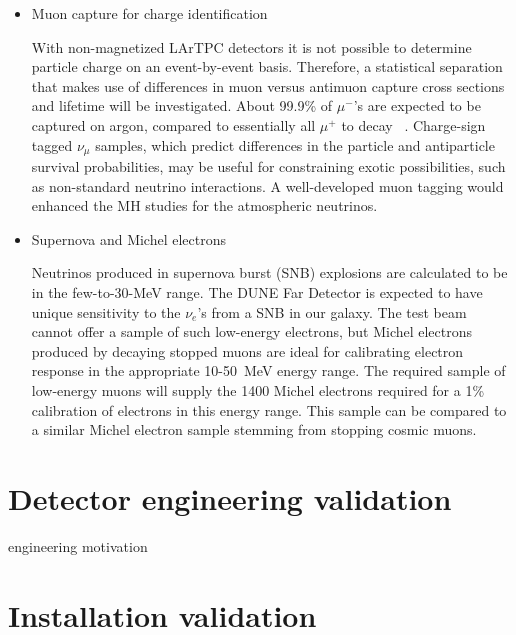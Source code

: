 \begin{itemize}
\item Muon capture for charge identification

With non-magnetized LArTPC detectors it is not possible to determine particle charge on an event-by-event basis. Therefore, a statistical separation that makes use of differences in muon versus antimuon capture cross sections and lifetime will be investigated.
About 99.9\% of $\mu^-$'s are expected to be captured on argon, compared to essentially all $\mu^+$ to decay ~\cite{stopmu}.
Charge-sign tagged $\nu_\mu$ samples, which predict differences in the particle and antiparticle survival probabilities, may be useful for constraining exotic possibilities, such as non-standard neutrino interactions. 
A well-developed muon tagging would enhanced the MH studies for the atmospheric neutrinos. 

\item Supernova and Michel electrons

Neutrinos produced in supernova burst (SNB) explosions are calculated to be in the few-to-30-MeV range.
The DUNE Far Detector is expected to have unique sensitivity to the $\nu_e$'s from a SNB in our galaxy.
%
The test beam cannot offer a sample of  such low-energy electrons, but Michel electrons  produced by 
decaying stopped muons are ideal for calibrating electron response in the appropriate 10-50~MeV energy range. 
The required  sample of low-energy muons will supply the 1400 Michel electrons required for a 1\% 
calibration of electrons in this energy range. This sample can be compared to a similar Michel electron sample
stemming from stopping cosmic muons.

\end{itemize}



\section{Detector engineering validation}
engineering motivation

\section{Installation validation}





